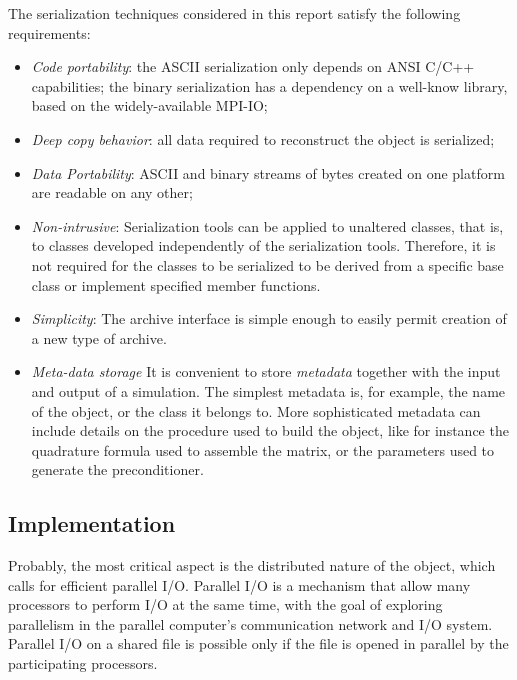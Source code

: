 \documentclass[11pt,relax]{SANDreport}
\begin{document}
The serialization techniques considered in this report satisfy the
following requirements:
\begin{itemize}
\item 
{\sl Code portability}: the ASCII serialization only depends on ANSI
C/C++ capabilities; the binary serialization has a dependency on a well-know
library, based on the widely-available MPI-IO;
\item 
{\sl Deep copy behavior}: all data required to reconstruct the object is
serialized;
\item 
{\sl Data Portability}: ASCII and binary streams of bytes created on one
platform are readable on any other;
\item
{\sl Non-intrusive}: Serialization tools can be applied to unaltered classes,
  that is, to classes developed independently of the serialization tools.
        Therefore, it is not required for the classes to be serialized to be
        derived from a specific base class or implement specified member
        functions. 
\item
{\sl Simplicity}: The archive interface is simple enough to easily permit
creation of a new type of archive.
\item
{\sl Meta-data storage}
It is convenient to store {\sl metadata} together with the input and
output of a simulation. The simplest metadata is, for example, the name of the
object, or the class it belongs to. More sophisticated metadata can include 
details on the procedure used to build the object, like for instance the
quadrature formula used to assemble the matrix, or the parameters used to
generate the preconditioner.
\end{itemize}

\subsection{Implementation}

Probably, the most critical aspect is the distributed nature of the object,
  which calls for efficient parallel I/O.
Parallel I/O is a mechanism that allow many
processors to perform I/O at the same time, with the goal of exploring
parallelism in the parallel computer's communication network and I/O system.
Parallel I/O on a shared file is possible only if the file is opened in
parallel by the participating processors.
\end{document}
